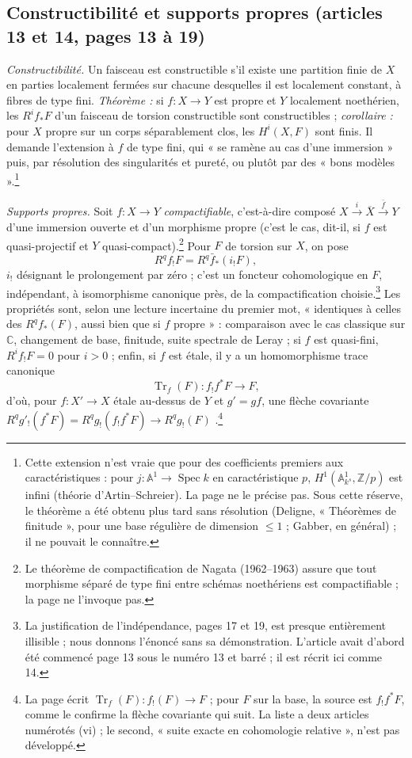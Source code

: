 \documentclass[11pt,a4paper]{article}
\begin{document}
\subsection*{Constructibilité et supports propres (articles 13 et 14, pages 13 à 19)}

\emph{Constructibilité.} Un faisceau est constructible s'il existe une
partition finie de $X$ en parties localement fermées sur chacune desquelles il
est localement constant, à fibres de type fini. \emph{Théorème :} si $f : X \to
Y$ est propre et $Y$ localement noethérien, les $R^{i}f_{*}F$ d'un faisceau de
torsion constructible sont constructibles ; \emph{corollaire :} pour $X$ propre
sur un corps séparablement clos, les $H^{i}(X, F)$ sont finis. Il demande
l'extension à $f$ de type fini, qui « se ramène au cas d'une immersion » puis,
par résolution des singularités et pureté, ou plutôt par des « bons
modèles ».\footnote{Cette extension n'est vraie que pour des coefficients
premiers aux caractéristiques : pour $j : \mathbb{A}^{1} \to \operatorname{Spec}
k$ en caractéristique $p$, $H^{1}(\mathbb{A}^{1}_{k^{s}}, \mathbb{Z}/p)$ est
infini (théorie d'Artin--Schreier). La page ne le précise pas. Sous cette
réserve, le théorème a été obtenu plus tard sans résolution (Deligne,
« Théorèmes de finitude », pour une base régulière de dimension $\leq 1$ ;
Gabber, en général) ; il ne pouvait le connaître.}

\emph{Supports propres.} Soit $f : X \to Y$ \emph{compactifiable}, c'est-à-dire
composé $X \xrightarrow{\,i\,} \overline{X} \xrightarrow{\,\bar f\,} Y$ d'une
immersion ouverte et d'un morphisme propre (c'est le cas, dit-il, si $f$ est
quasi-projectif et $Y$ quasi-compact).\footnote{Le théorème de compactification
de Nagata (1962--1963) assure que tout morphisme séparé de type fini entre
schémas noethériens est compactifiable ; la page ne l'invoque pas.} Pour $F$ de
torsion sur $X$, on pose
\[
  R^{q}f_{!}F = R^{q}\bar f_{*}(i_{!}F),
\]
$i_{!}$ désignant le prolongement par zéro ; c'est un foncteur cohomologique en
$F$, indépendant, à isomorphisme canonique près, de la compactification
choisie.\footnote{La justification de l'indépendance, pages 17 et 19, est
presque entièrement illisible ; nous donnons l'énoncé sans sa démonstration.
L'article avait d'abord été commencé page 13 sous le numéro 13 et barré ; il
est récrit ici comme 14.} Les propriétés sont, selon une lecture incertaine du premier mot,
« identiques à celles des $R^{q}f_{*}(F)$, aussi bien que si $f$ propre » : comparaison avec le cas classique sur
$\mathbb{C}$, changement de base, finitude, suite spectrale de Leray ; si $f$
est quasi-fini, $R^{i}f_{!}F = 0$ pour $i > 0$ ; enfin, si $f$ est étale, il y
a un homomorphisme trace canonique
\[
  \operatorname{Tr}_{f}(F) : f_{!}f^{*}F \longrightarrow F,
\]
d'où, pour $f : X' \to X$ étale au-dessus de $Y$ et $g' = gf$, une flèche
covariante $R^{q}g'_{!}(f^{*}F) = R^{q}g_{!}(f_{!}f^{*}F) \to R^{q}g_{!}(F)$
.\footnote{La page écrit $\operatorname{Tr}_{f}(F) : f_{!}(F) \to F$ ; pour $F$
sur la base, la source est $f_{!}f^{*}F$, comme le confirme la flèche
covariante qui suit. La liste a deux articles numérotés (vi) ; le second,
« suite exacte en cohomologie relative », n'est pas développé.}
\end{document}

